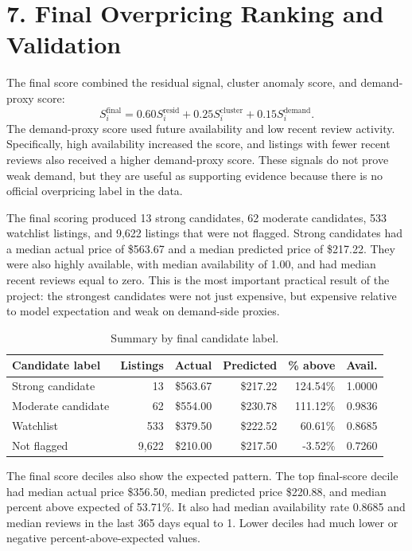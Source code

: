 \documentclass[11pt]{article}
\begin{document}
\section*{7. Final Overpricing Ranking and Validation}

The final score combined the residual signal, cluster anomaly score, and demand-proxy score:
\[
S^{\text{final}}_i
=0.60S^{\text{resid}}_i
+0.25S^{\text{cluster}}_i
+0.15S^{\text{demand}}_i.
\]
The demand-proxy score used future availability and low recent review activity. Specifically, high availability increased the score, and listings with fewer recent reviews also received a higher demand-proxy score. These signals do not prove weak demand, but they are useful as supporting evidence because there is no official overpricing label in the data.

The final scoring produced 13 strong candidates, 62 moderate candidates, 533 watchlist listings, and 9,622 listings that were not flagged. Strong candidates had a median actual price of \$563.67 and a median predicted price of \$217.22. They were also highly available, with median availability of 1.00, and had median recent reviews equal to zero. This is the most important practical result of the project: the strongest candidates were not just expensive, but expensive relative to model expectation and weak on demand-side proxies.

\begin{table}[H]
\centering
\caption{Summary by final candidate label.}
\small
\begin{tabular}{L{0.24\textwidth}rrrrr}
\toprule
Candidate label & Listings & Actual & Predicted & \% above & Avail. \\
\midrule
Strong candidate & 13 & \$563.67 & \$217.22 & 124.54\% & 1.0000 \\
Moderate candidate & 62 & \$554.00 & \$230.78 & 111.12\% & 0.9836 \\
Watchlist & 533 & \$379.50 & \$222.52 & 60.61\% & 0.8685 \\
Not flagged & 9,622 & \$210.00 & \$217.50 & -3.52\% & 0.7260 \\
\bottomrule
\end{tabular}
\end{table}

The final score deciles also show the expected pattern. The top final-score decile had median actual price \$356.50, median predicted price \$220.88, and median percent above expected of 53.71\%. It also had median availability rate 0.8685 and median reviews in the last 365 days equal to 1. Lower deciles had much lower or negative percent-above-expected values.
\end{document}
